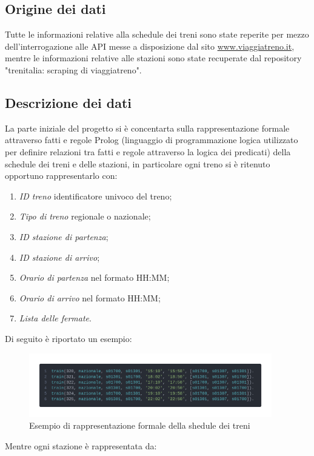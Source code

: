 \documentclass[italian,12pt,a4paper]{article}
\begin{document}
		\subsection{Origine dei dati}
			Tutte le informazioni relative alla schedule dei treni sono state reperite per mezzo dell'interrogazione alle API messe a disposizione dal sito \href{http://www.viaggiatreno.it/infomobilita/index.jsp}{www.viaggiatreno.it}, mentre le informazioni relative alle stazioni sono state recuperate dal repository "trenitalia: scraping di viaggiatreno".\cite{dati_stazioni}
			
		\subsection{Descrizione dei dati}
			La parte iniziale del progetto si è concentarta sulla rappresentazione formale attraverso fatti e regole Prolog (linguaggio di programmazione logica utilizzato per definire relazioni tra fatti e regole attraverso la logica dei predicati) della schedule dei treni e delle stazioni, in particolare ogni treno si è ritenuto opportuno rappresentarlo con:
	
			\begin{enumerate}
				\item \textit{ID treno} identificatore univoco del treno;
				\item \textit{Tipo di treno} regionale o nazionale;
				\item \textit{ID stazione di partenza};
				\item \textit{ID stazione di arrivo};
				\item\textit{Orario di partenza} nel formato HH:MM;
				\item \textit{Orario di arrivo} nel formato HH:MM;
				\item \textit{Lista delle fermate}.
			\end{enumerate} 
			\vspace{20px}
			Di seguito è riportato un esempio:
			
			\begin{figure}[!h]
				\centering
				\includegraphics[width=400px]{img/code_prolog1}
				\caption{Esempio di rappresentazione formale della shedule dei treni}
			\end{figure}
			\newpage
			Mentre ogni stazione è rappresentata da:
		
\end{document}
